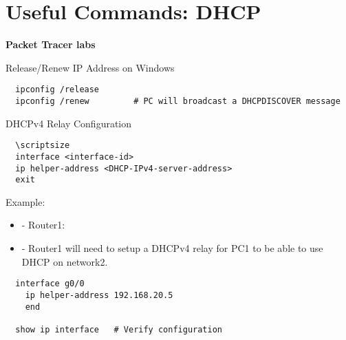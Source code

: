 \documentclass[../EngineeringJournal_CDavis.tex]{subfiles}
\begin{document}

\chapter*{Useful Commands: \linebreak[1] DHCP \hspace*{\fill}{2020}}
\noindent\textbf{{Packet Tracer labs} }                             



\hspace{0.2cm}
\begin{tcolorbox}[width=6.3in]
Release/Renew IP Address on Windows
  \scriptsize 
  \begin{verbatim}
  ipconfig /release
  ipconfig /renew         # PC will broadcast a DHCPDISCOVER message
  \end{verbatim}
\end{tcolorbox}
\hspace{0.2cm}
\normalsize  



\hspace{0.2cm}
\begin{tcolorbox}[width=6.3in]
DHCPv4 Relay Configuration
\begin{verbatim}
  \scriptsize 
  interface <interface-id>
  ip helper-address <DHCP-IPv4-server-address>
  exit
\end{verbatim}
  Example:
  \begin{itemize}
    \item{- Router1:} 
    \item{- Router1 will need to setup a DHCPv4 relay for PC1 to be able to use DHCP on network2.} 
  \end{itemize}
\begin{verbatim}
  interface g0/0
    ip helper-address 192.168.20.5
    end
    
  show ip interface   # Verify configuration
\end{verbatim}
\end{tcolorbox}
\hspace{0.2cm}
\normalsize  
\end{document}
